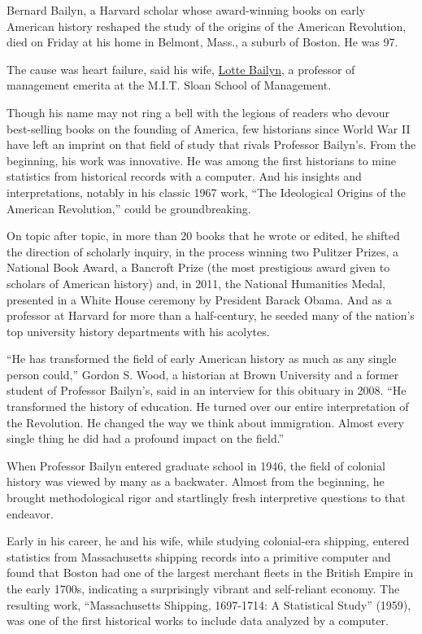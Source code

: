 Bernard Bailyn, a Harvard scholar whose award-winning books on early
American history reshaped the study of the origins of the American
Revolution, died on Friday at his home in Belmont, Mass., a suburb of
Boston. He was 97.

The cause was heart failure, said his wife,
\href{https://mitsloan.mit.edu/faculty/directory/lotte-bailyn}{Lotte
Bailyn}, a professor of management emerita at the M.I.T. Sloan School of
Management.

Though his name may not ring a bell with the legions of readers who
devour best-selling books on the founding of America, few historians
since World War II have left an imprint on that field of study that
rivals Professor Bailyn's. From the beginning, his work was innovative.
He was among the first historians to mine statistics from historical
records with a computer. And his insights and interpretations, notably
in his classic 1967 work, ``The Ideological Origins of the American
Revolution,'' could be groundbreaking.

On topic after topic, in more than 20 books that he wrote or edited, he
shifted the direction of scholarly inquiry, in the process winning two
Pulitzer Prizes, a National Book Award, a Bancroft Prize (the most
prestigious award given to scholars of American history) and, in 2011,
the National Humanities Medal, presented in a White House ceremony by
President Barack Obama. And as a professor at Harvard for more than a
half-century, he seeded many of the nation's top university history
departments with his acolytes.

``He has transformed the field of early American history as much as any
single person could,'' Gordon S. Wood, a historian at Brown University
and a former student of Professor Bailyn's, said in an interview for
this obituary in 2008. ``He transformed the history of education. He
turned over our entire interpretation of the Revolution. He changed the
way we think about immigration. Almost every single thing he did had a
profound impact on the field.''

When Professor Bailyn entered graduate school in 1946, the field of
colonial history was viewed by many as a backwater. Almost from the
beginning, he brought methodological rigor and startlingly fresh
interpretive questions to that endeavor.

Early in his career, he and his wife, while studying colonial-era
shipping, entered statistics from Massachusetts shipping records into a
primitive computer and found that Boston had one of the largest merchant
fleets in the British Empire in the early 1700s, indicating a
surprisingly vibrant and self-reliant economy. The resulting work,
``Massachusetts Shipping, 1697-1714: A Statistical Study'' (1959), was
one of the first historical works to include data analyzed by a
computer.


